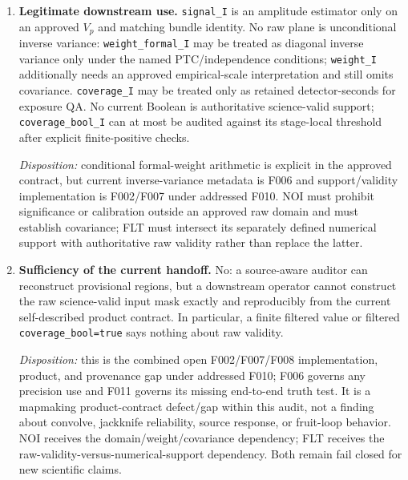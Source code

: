 \documentclass[11pt]{article}
\newcommand{\code}[1]{\nolinkurl{#1}}
\begin{document}
\begin{enumerate}[leftmargin=*,label=\arabic*.]
At the governing SHA, the \(c/10\) normalization floor and full-\(c\) Boolean
threshold create two algorithmic regions, but the product contract neither
names the retained-low-confidence state nor persists both decisions exactly.
The distinction is now owner-approved but remains only diagnostically
inferable in governing products (open F007 under addressed F010, with F002 for
the Boolean).  NOI/FLT must keep science validity and operator computability as
separate masks and may never let finite output promote invalid input.

\item \textbf{Legitimate downstream use.}
\code{signal_I} is an amplitude estimator only on an approved \(V_p\) and
matching bundle identity.  No raw plane is unconditional inverse variance:
\code{weight_formal_I} may be treated as diagonal inverse variance only under
the named PTC/independence conditions; \code{weight_I} additionally needs an
approved empirical-scale interpretation and still omits covariance.
\code{coverage_I} may be treated only as retained detector-seconds for exposure
QA.  No current Boolean is authoritative science-valid support;
\code{coverage_bool_I} can at most be audited against its stage-local threshold
after explicit finite-positive checks.

\emph{Disposition:} conditional formal-weight arithmetic is explicit in the
approved contract, but current inverse-variance metadata is F006 and
support/validity implementation is F002/F007 under addressed F010.  NOI must prohibit significance
or calibration outside an approved raw domain and must establish covariance;
FLT must intersect its separately defined numerical support with authoritative
raw validity rather than replace the latter.

\item \textbf{Sufficiency of the current handoff.}
No: a source-aware auditor can reconstruct provisional regions, but a
downstream operator cannot construct the raw science-valid input mask exactly
and reproducibly from the current self-described product contract.  In
particular, a finite filtered value or filtered \code{coverage_bool=true} says
nothing about raw validity.

\emph{Disposition:} this is the combined open F002/F007/F008 implementation,
product, and provenance gap under addressed F010; F006 governs any precision
use and F011 governs its missing end-to-end truth test.  It is a mapmaking
product-contract defect/gap within this audit, not a
finding about convolve, jackknife reliability, source response, or fruit-loop
behavior.  NOI receives the domain/weight/covariance dependency; FLT receives
the raw-validity-versus-numerical-support dependency.  Both remain fail closed
for new scientific claims.
\end{enumerate}
\end{document}
